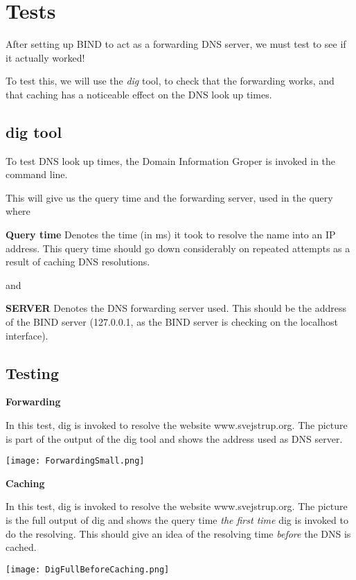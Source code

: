 \section{Tests}
After setting up BIND to act as a forwarding DNS server, we must test to see if it actually worked!

To test this, we will use the \textit{dig} tool, to check that the forwarding works, and that caching has a noticeable effect on the DNS look up times. 
\subsection{dig tool}
To test DNS look up times, the Domain Information Groper is invoked in the command line.

This will give us the query time and the forwarding server, used in the query where

\textbf{Query time}
Denotes the time (in ms) it took to resolve the name into an IP address.
This query time should go down considerably on repeated attempts as a result of caching DNS resolutions.

and

\textbf{SERVER}
Denotes the DNS forwarding server used. This should be the address of the BIND server (127.0.0.1, as the BIND server is checking on the localhost interface).


\subsection{Testing}
\textbf{Forwarding}

In this test, dig is invoked to resolve the website www.svejstrup.org. 
The picture is part of the output of the dig tool and shows the address used as DNS server.

\begin{center}
	\texttt{[image: ForwardingSmall.png]}
\end{center}

\textbf{Caching}

In this test, dig is invoked to resolve the website www.svejstrup.org.
The picture is the full output of dig and shows the query time \textit{the first time} dig is invoked to do the resolving. This should give an idea of the resolving time \textit{before} the DNS is cached.

\begin{center}
	\texttt{[image: DigFullBeforeCaching.png]}
\end{center}

